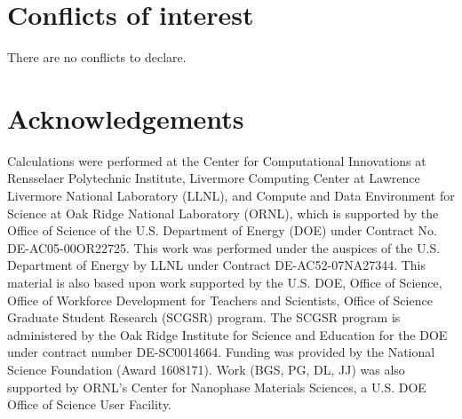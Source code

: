 \documentclass[twoside,twocolumn,9pt]{article}
\renewcommand{\refname}{Notes and references}
\begin{document}
\section*{Conflicts of interest}
\label{sec:conflicts}
There are no conflicts to declare.

\section*{Acknowledgements}
\label{sec:acknowledgements}

Calculations were performed at the Center for Computational Innovations at
Rensselaer Polytechnic Institute, Livermore Computing Center at Lawrence
Livermore National Laboratory (LLNL), and Compute and Data Environment for
Science at Oak Ridge National Laboratory (ORNL), which is supported by the
Office of Science of the U.S. Department of Energy (DOE) under Contract No.
DE-AC05-00OR22725.
This work was performed under the auspices of the U.S. Department of Energy by
LLNL under Contract DE-AC52-07NA27344.
This material is also based upon work supported by the U.S. DOE, Office of
Science, Office of Workforce Development for Teachers and Scientists, Office of
Science Graduate Student Research (SCGSR) program.
The SCGSR program is administered by the Oak Ridge Institute for Science and
Education for the DOE under contract number DE-SC0014664.
Funding was provided by the National Science Foundation (Award 1608171).  Work
(BGS, PG, DL, JJ) was also supported by ORNL's Center for Nanophase Materials
Sciences, a U.S. DOE Office of Science User Facility.



\balance



\end{document}
